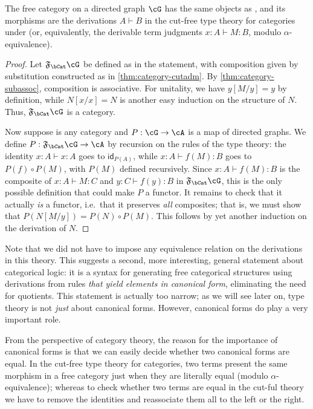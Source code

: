 \documentclass{book}
\def\idfunc{\mathsf{id}}
\let\types\vdash
\newcommand{\F}[1]{\mathfrak{F}_{#1}}
\begin{document}
\begin{thm}\label{thm:category-initial-2}
  The free category on a directed graph $\cG$ has the same objects as \cG, and its morphisms are the derivations $A\types B$ in the cut-free type theory for categories under \cG (or, equivalently, the derivable term judgments $x:A \types M:B$, modulo $\alpha$-equivalence).
\end{thm}
\begin{proof}
  Let $\F\bCat\cG$ be defined as in the statement, with composition given by substitution constructed as in \cref{thm:category-cutadm}.
  By \cref{thm:category-subassoc}, composition is associative.
  For unitality, we have $y[M/y] = y$ by definition, while $N[x/x] = N$ is another easy induction on the structure of $N$.
  Thus, $\F\bCat\cG$ is a category.

  Now suppose \cA is any category and $P:\cG\to\cA$ is a map of directed graphs.
  We define $P:\F\bCat\cG \to\cA$ by recursion on the rules of the type theory: the identity $x:A\types x:A$ goes to $\idfunc_{P(A)}$, while $x:A\types f(M):B$ goes to $P(f) \circ P(M)$, with $P(M)$ defined recursively.
  Since $x:A\types f(M):B$ is the composite of $x:A\types M:C$ and $y:C\types f(y):B$ in $\F\bCat\cG$, this is the only possible definition that could make $P$ a functor.
  It remains to check that it actually \emph{is} a functor, i.e.\ that it preserves \emph{all} composites; that is, we must show that $P(N[M/y]) = P(N) \circ P(M)$.
  This follows by yet another induction on the derivation of $N$.
\end{proof}

Note that we did not have to impose any equivalence relation on the derivations in this theory.
This suggests a second, more interesting, general statement about categorical logic: it is
{a syntax for generating free categorical structures using derivations from rules}
\emph{that yield elements in canonical form}, eliminating the need for quotients.
This statement is actually too narrow; as we will see later on, type theory is not \emph{just} about canonical forms.
However, canonical forms do play a very important role.

From the perspective of category theory, the reason for the importance of canonical forms is that we can easily decide whether two canonical forms are equal.
In the cut-free type theory for categories, two terms present the same morphism in a free category just when they are literally equal (modulo $\alpha$-equivalence); whereas to check whether two terms are equal in the cut-ful theory we have to remove the identities and reassociate them all to the left or the right.
\end{document}

